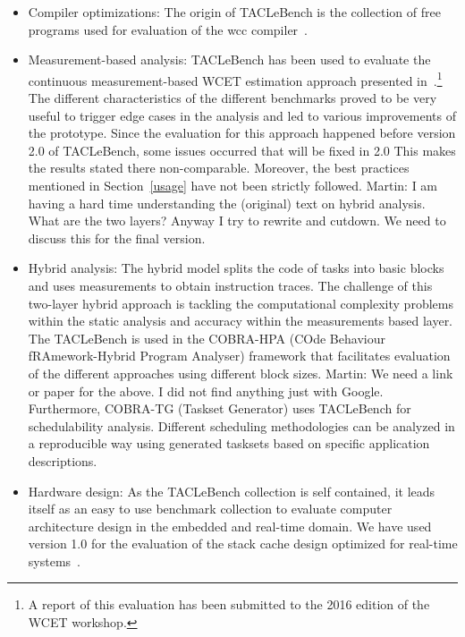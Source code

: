 \documentclass[a4paper,UKenglish]{oasics}
\newcommand{\todo}[1]{{\emph{TODO: #1}}}
\newcommand{\martin}[1]{{\color{blue} Martin: #1}}
\begin{document}
\begin{itemize}
\item Compiler optimizations: The origin of TACLeBench is the collection of free
programs used for evaluation of the wcc compiler~\cite{falk:wcc:wcet06}.
\item Measurement-based analysis: TACLeBench has been used to evaluate the continuous measurement-based WCET estimation approach presented
in~\cite{Dreyer2015}.\footnote{A report of this evaluation has been submitted to the 2016 edition of the WCET workshop.}
The different characteristics of the different benchmarks proved to be very useful to trigger edge cases in the analysis and led to various improvements of the prototype.
Since the evaluation for this approach happened before version 2.0 of TACLeBench,
some issues occurred that will be fixed in 2.0
This makes the results stated there non-comparable.
Moreover, the best practices mentioned in Section~\ref{usage} have not been strictly followed.
\martin{I am having a hard time understanding the (original) text on hybrid analysis.
What are the two layers? 
Anyway I try to rewrite and cutdown. We need to discuss this for the final version.}
\item Hybrid analysis: The hybrid model splits the code of tasks into basic blocks
and uses measurements to obtain instruction traces.
The  challenge  of  this  two-layer  hybrid  approach  is  tackling the computational complexity problems within the static analysis and accuracy  within  the  measurements based  layer.
The TACLeBench is used in the COBRA-HPA (COde Behaviour fRAmework-Hybrid Program Analyser) framework that facilitates evaluation of the different approaches using different block sizes.
\martin{We need a link or paper for the above. I did not find anything just with Google.}
Furthermore, COBRA-TG (Taskset Generator) uses TACLeBench for schedulability analysis.
Different scheduling methodologies can be analyzed in a reproducible way using generated
tasksets based on specific application descriptions.
\item Hardware design: As the TACLeBench collection is self contained, it leads itself
as an easy to use benchmark collection to evaluate computer architecture design in the
embedded and real-time domain. We have used version 1.0 for the evaluation of the
stack cache design optimized for real-time systems~\cite{patmos:stackcache:rts}.


\end{itemize}
\end{document}
